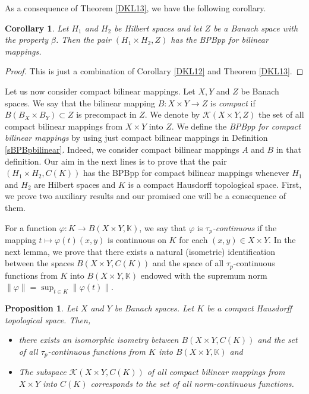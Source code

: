 \documentclass[12pt,a4paper]{amsart}
\newtheorem{proposition}[theorem]{Proposition}
\newtheorem{corollary}[theorem]{Corollary}
\theoremstyle{definition}
\numberwithin{equation}{section}
\newcommand{\K}{\mathbb{K}} %
\def\K{{\mathbb K}}
\begin{document}
As a consequence of Theorem \ref{DKL13}, we have the following corollary.

\begin{corollary} Let $H_1$ and $H_2$ be Hilbert spaces and let $Z$ be a Banach space with the property $\beta$. Then the pair $(H_1 \times H_2, Z)$ has the BPBpp for bilinear mappings.
\end{corollary}

\begin{proof} This is just a combination of Corollary \ref{DKL12} and Theorem \ref{DKL13}.
\end{proof}



Let us now consider compact bilinear mappings. Let $X, Y$ and $Z$ be Banach spaces. We say that the bilinear mapping $B: X \times Y \longrightarrow Z$ is {\it compact} if $B(B_X \times B_Y) \subset Z$ is precompact in $Z$. We denote by $\mathcal{K}(X \times Y, Z)$ the set of all compact bilinear mappings from $X \times Y$ into $Z$. We define the {\it BPBpp for compact bilinear mappings} by using just compact bilinear mappings in Definition \ref{sBPBpbilinear}. Indeed, we consider compact bilinear mappings $A$ and $B$ in that definition.  Our aim in the next lines is to prove that the pair $(H_1 \times H_2, C(K))$ has the BPBpp for compact bilinear mappings whenever $H_1$ and $H_2$ are Hilbert spaces and $K$ is a compact Hausdorff topological space. First, we prove two auxiliary results and our promised one will be a consequence of them.

 For a function $\varphi: K \longrightarrow B (X \times Y, \K)$, we say that $\varphi$ is {\it $\tau_p$-continuous} if the mapping $t \longmapsto \varphi(t)(x, y)$ is continuous on $K$ for each $(x, y) \in X \times Y$. In the next lemma, we prove that there exists a natural (isometric) identification between the spaces $B (X \times Y, C(K))$ and the space of all $\tau_p$-continuous functions from $K$ into $B (X \times Y, \K)$ endowed with the supremum norm $\|\varphi\| = \sup_{t \in K} \|\varphi(t)\|$.


\begin{proposition}{\cite[Theorem 1, p. 490]{DS}} Let $X$ and $Y$ be Banach spaces. Let $K$ be a compact Hausdorff topological space. Then,
	\begin{itemize}
		\item[(i)] there exists an isomorphic isometry between $B (X \times Y, C(K))$ and the set of all $\tau_p$-continuous functions from $K$ into $B (X \times Y, \K)$ and
		\item[(ii)] The subspace $\mathcal{K}(X \times Y, C(K))$ of all compact bilinear mappings from $X \times Y$ into $C(K)$ corresponds to the set of all norm-continuous functions.
	\end{itemize}
	\label{DKL14}
\end{proposition}
\end{document}

